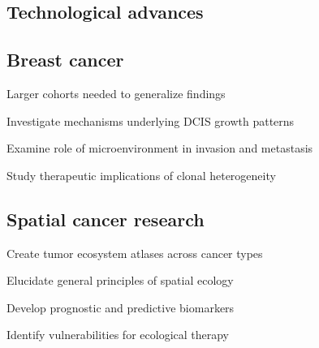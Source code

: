 \subsection{Technological advances}

\subsection{Breast cancer}

Larger cohorts needed to generalize findings

Investigate mechanisms underlying DCIS growth patterns

Examine role of microenvironment in invasion and metastasis

Study therapeutic implications of clonal heterogeneity

\subsection{Spatial cancer research}

Create tumor ecosystem atlases across cancer types

Elucidate general principles of spatial ecology

Develop prognostic and predictive biomarkers

Identify vulnerabilities for ecological therapy

